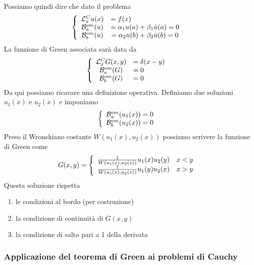 Possiamo quindi dire che dato il problema
\begin{align}
	\triple{\mathcal{L}_x^{C} u(x) &= f(x) \hfill}{\mathcal{B}^{om}_a(u) &= \alpha_1 u(a) + \beta_1 \dot{u}(a) = 0}{\mathcal{B}^{om}_b(u) &= \alpha_2 u(b) + \beta_2 \dot{u}(b) = 0} \label{omcond1}
\end{align}
La funzione di Green associata sarà data da
\begin{align}
	\triple{\mathcal{L}_x^{C} G(x,y) &= \delta(x-y)}{\mathcal{B}^{om}_a(G) &= 0 \hfill}{\mathcal{B}^{om}_b(G) &= 0 \hfill}
\end{align}
Da qui possiamo ricavare una definizione operativa. Definiamo due soluzioni $u_1(x)$ e $u_2(x)$ e imponiamo
\begin{align}
	\left\{ \begin{array}{cc} \mathcal{B}^{om}_a(u_1(x)) = 0\\ \mathcal{B}^{om}_b(u_2(x)) = 0 \end{array} \right.
\end{align}
Preso il Wronskiano costante $W(u_1(x),u_2(x))$ possiamo scrivere la funzione di Green come
\begin{align}
	G(x,y) = \left\{ \begin{array}{cc} \frac{1}{W(u_1(x),u_2(x))}u_1(x)u_2(y) \quad x<y\\ \frac{1}{W(u_1(x),u_2(x))}u_1(y)u_2(x) \quad x>y \end{array} \right.
\end{align}
Questa soluzione rispetta 
\begin{enumerate}
	\item le condizioni al bordo (per costruzione) 
	\item la condizione di continuità di $G(x,y)$
	\item la condizione di salto pari a 1 della derivata
\end{enumerate}
 \newpage
\subsubsection{Applicazione del teorema di Green ai problemi di Cauchy}

